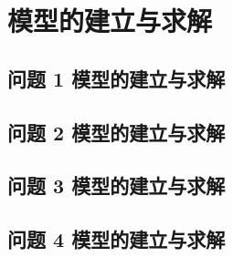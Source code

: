 
\section{模型的建立与求解}


\subsection{问题 1 模型的建立与求解}







\subsection{问题 2 模型的建立与求解}







\subsection{问题 3 模型的建立与求解}







\subsection{问题 4 模型的建立与求解}






